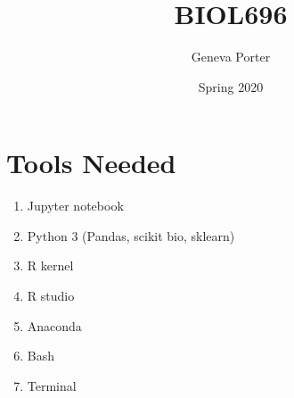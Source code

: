 \documentclass{article}
\title{BIOL696}
\author{Geneva Porter}
\date{Spring 2020}
\begin{document}
\maketitle

\section{Tools Needed}

\begin{enumerate}
    \item Jupyter notebook
    \item Python 3 (Pandas, scikit bio, sklearn)
    \item R kernel
    \item R studio
    \item Anaconda
    \item Bash
    \item Terminal
\end{enumerate}
\end{document}

